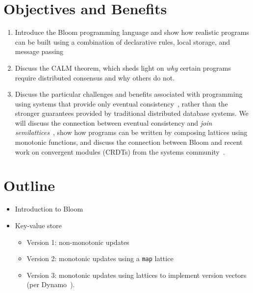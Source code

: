 \documentclass{sig-alternate}
\begin{document}
\section{Objectives and Benefits}

\begin{enumerate}
\item
  Introduce the Bloom programming language and show how realistic programs can
  be built using a combination of declarative rules, local storage, and message
  passing
\item
  Discuss the CALM theorem, which sheds light on \emph{why} certain programs
  require distributed consensus and why others do not.
\item
  Discuss the particular challenges and benefits associated with programming
  using systems that provide only eventual
  consistency~\cite{DeCandia2007,Terry1995,vogels}, rather than the stronger
  guarantees provided by traditional distributed database systems. We will
  discuss the connection between eventual consistency and \emph{join
    semilattices}~\cite{Conway2012}, show how programs can be written by
  composing lattices using monotonic functions, and discuss the connection
  between Bloom and recent work on convergent modules (CRDTs) from the systems
  community~\cite{Shapiro2011a,Shapiro2011b}.
\end{enumerate}

\section{Outline}

\begin{itemize}
\item
  Introduction to Bloom
\item
  Key-value store
  \begin{itemize}
  \item
    Version 1: non-monotonic updates
  \item
    Version 2: monotonic updates using a \texttt{map} lattice
  \item
    Version 3: monotonic updates using lattices to implement version vectors
    (per Dynamo~\cite{DeCandia2007}).
  \end{itemize}
\end{itemize}



\end{document}
